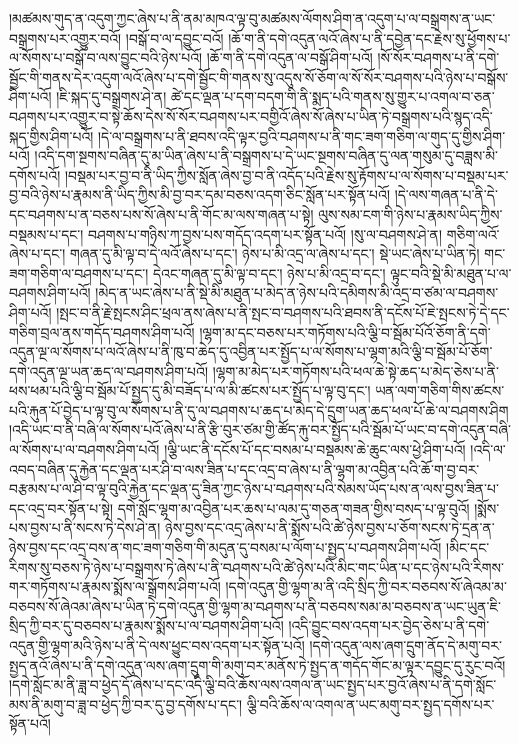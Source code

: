 །མཚམས་གུད་ན་འདུག་ཀྱང་ཞེས་པ་ནི་ནམ་མཁའ་ལྟ་བུ་མཚམས་ལོགས་ཤིག་ན་འདུག་པ་ལ་བསྒྲགས་ན་ཡང་བསྒྲགས་པར་འགྱུར་བའོ། །བསྒོ་བ་ལ་དབྱུང་བའོ། །ཆོ་ག་ནི་དགེ་འདུན་ལའོ་ཞེས་པ་ནི་དབྱེན་དང་རྗེས་སུ་ཕྱོགས་པ་ལ་སོགས་པ་བསྒོ་བ་ལས་བྱུང་བའི་ཉེས་པའོ། །ཆོ་ག་ནི་དགེ་འདུན་ལ་བསྒོ་ཤིག་པའོ། །སོ་སོར་བཤགས་པ་ནི་དགེ་སྦྱོང་གི་གནས་དེར་འདུག་ལའོ་ཞེས་པ་དགེ་སྦྱོང་གི་གནས་སུ་འདུས་སོ་ཅོག་ལ་སོ་སོར་བཤགས་པའི་ཉེས་པ་བསྒོས་ཤིག་པའོ། །ཇི་སྐད་དུ་བསྒྲགས་ཤེ་ན། ཚེ་དང་ལྡན་པ་དག་བདག་གི་ནི་སྨད་པའི་གནས་སུ་གྱུར་པ་འགལ་བ་ཅན་བཤགས་པར་འགྱུར་བ་སྟེ་ཆོས་དེས་སོ་སོར་བཤགས་པར་བགྱིའོ་ཞེས་སོ་ཞེས་པ་ཡིན་ཏེ་བསྒྲགས་པའི་སྙད་འདི་སྐད་གྱིས་ཤིག་པའོ། །དེ་ལ་བསྒྲགས་པ་ནི་ཐབས་འདི་ལྟར་བྱའི་བཤགས་པ་ནི་གང་ཟག་གཅིག་ལ་གུད་དུ་གྱིས་ཤིག་པའོ། །འདི་དག་སྔགས་བཞིན་དུ་མ་ཡིན་ཞེས་པ་ནི་བསྒྲགས་པ་དེ་ཡང་སྔགས་བཞིན་དུ་ལན་གསུམ་དུ་བཟླས་མི་དགོས་པའོ། །བསྡམ་པར་བྱ་བ་ནི་ཡིད་ཀྱིས་སློན་ཞེས་བྱ་བ་ནི་འདོད་པའི་རྗེས་སུ་རྟོགས་པ་ལ་སོགས་པ་བསྡམ་པར་བྱ་བའི་ཉེས་པ་རྣམས་ནི་ཡིད་ཀྱིས་མི་བྱ་བར་དམ་བཅས་འདག་ཅིང་སློན་པར་སྟོན་པའོ། །དེ་ལས་གཞན་པ་ནི་དེ་དང་བཤགས་པ་ན་བཅས་པས་སོ་ཞེས་པ་ནི་གོང་མ་ལས་གཞན་པ་སྟེ། ལུས་སམ་ངག་གི་ཉེས་པ་རྣམས་ཡིད་ཀྱིས་བསྡམས་པ་དང་། བཤགས་པ་གཉིས་ཀ་བྱས་པས་གདོད་འདག་པར་སྟོན་པའོ། །སུ་ལ་བཤགས་ཤེ་ན། གཅིག་ལའོ་ཞེས་པ་དང་། གཞན་དུ་མི་ལྟ་བ་དེ་ལའོ་ཞེས་པ་དང་། ཉེས་པ་མི་འདྲ་ལ་ཞེས་པ་དང་། སྡེ་ཡང་ཞེས་པ་ཡིན་ཏེ། གང་ཟག་གཅིག་ལ་བཤགས་པ་དང་། དེའང་གཞན་དུ་མི་ལྟ་བ་དང་། ཉེས་པ་མི་འདྲ་བ་དང་། ལྟུང་བའི་སྡེ་མི་མཐུན་པ་ལ་བཤགས་ཤིག་པའོ། །མེད་ན་ཡང་ཞེས་པ་ནི་སྡེ་མི་མཐུན་པ་མེད་ན་ཉེས་པའི་དམིགས་མི་འདྲ་བ་ཙམ་ལ་བཤགས་ཤིག་པའོ། །སྤང་བ་ནི་རྗེ་སྤངས་ཤིང་ཕྲལ་ནས་ཞེས་པ་ནི་སྤང་བ་བཤགས་པའི་ཐབས་ནི་དངོས་པོ་ཇེ་སྤངས་ཏེ་དེ་དང་གཅིག་བྲལ་ནས་གདོད་བཤགས་ཤིག་པའོ། །ལྷག་མ་དང་བཅས་པར་གཏོགས་པའི་ལྕི་བ་སྦོམ་པོའོ་ཅོག་ནི་དགེ་འདུན་ལྔ་ལ་སོགས་པ་ལའོ་ཞེས་པ་ནི་ཁུ་བ་ཆེད་དུ་འབྱིན་པར་སྤྱོད་པ་ལ་སོགས་པ་ལྷག་མའི་ལྕི་བ་སྦོམ་པོ་ཅོག་དགེ་འདུན་ལྔ་ཡན་ཆད་ལ་བཤགས་ཤིག་པའོ། །ལྷག་མ་མེད་པར་གཏོགས་པའི་ཕལ་ཆེ་སྟེ་ཆད་པ་མེད་ཅེས་པ་ནི་ཕས་ཕམ་པའི་ལྕི་བ་སྦོམ་པོ་སྤྱད་དུ་མི་བཟོད་པ་ལ་མི་ཚངས་པར་སྤྱོད་པ་ལྟ་བུ་དང་། ཡན་ལག་གཅིག་གིས་ཚངས་པའི་རྐུན་པོ་བྱེད་པ་ལྟ་བུ་ལ་སོགས་པ་ནི་དུ་ལ་བཤགས་པ་ཆད་པ་མེད་དེ་དྲུག་ཡན་ཆད་ཕལ་པོ་ཆེ་ལ་བཤགས་ཤིག །འདི་ཡང་བ་ནི་བཞི་ལ་སོགས་པའོ་ཞེས་པ་ནི་རྩི་བུར་ཙམ་གྱི་ཚོད་རྐུ་བར་སྤྱོད་པའི་སྦོམ་པོ་ཡང་བ་དགེ་འདུན་བཞི་ལ་སོགས་པ་ལ་བཤགས་ཤིག་པའོ། །ལྕི་ཡང་ནི་དངོས་པོ་དང་བསམ་པ་བསྡམས་ཆེ་ཆུང་ལས་ཕྱེ་ཤིག་པའོ། །འདི་ལ་འབད་བཞིན་དུ་རྐྱེན་དང་ལྡན་པར་ཤི་བ་ལས་ཟིན་པ་དང་འདྲ་བ་ཞེས་པ་ནི་ལྷག་མ་འབྱིན་པའི་ཆོ་ག་བྱ་བར་བརྩམས་པ་ལ་ཤི་བ་ལྟ་བུའི་རྐྱེན་དང་ལྡན་དུ་ཟིན་ཀྱང་ཉེས་པ་བཤགས་པའི་སེམས་ཡོད་པས་ན་ལས་བྱས་ཟིན་པ་དང་འདྲ་བར་སྟོན་པ་སྟེ། དགེ་སློང་ལྷག་མ་འབྱིན་པར་ཆས་པ་ལམ་དུ་གཅན་གཟན་གྱིས་བསད་པ་ལྟ་བུའོ། །སྨོས་པས་བྱས་པ་ནི་སངས་ཏེ་དེས་ཤེ་ན། ཉེས་བྱས་དང་འདྲ་ཞེས་པ་ནི་སྨོས་པའི་ཚེ་ཉེས་བྱས་པ་ཅོག་སངས་ཏེ་དྲན་ན་ཉེས་བྱས་དང་འདྲ་བས་ན་གང་ཟག་གཅིག་གི་མདུན་དུ་བསམ་པ་ལོག་པ་སྤྱད་པ་བཤགས་ཤིག་པའོ། །མིང་དང་རིགས་སུ་བཅས་ཏེ་ཉེས་པ་བསྒྲགས་ཏེ་ཞེས་པ་ནི་བཤགས་པའི་ཚེ་ཉེས་པའི་མིང་གང་ཡིན་པ་དང་ཉེས་པའི་རིགས་གར་གཏོགས་པ་རྣམས་སྨོས་ལ་སྒྲོགས་ཤིག་པའོ། །དགེ་འདུན་གྱི་ལྷག་མ་ནི་འདི་སྲིད་ཀྱི་བར་བཅབས་སོ་ཞེའམ་མ་བཅབས་སོ་ཞེའམ་ཞེས་པ་ཡིན་ཏེ་དགེ་འདུན་གྱི་ལྷག་མ་བཤགས་པ་ནི་བཅབས་སམ་མ་བཅབས་ན་ཡང་ཡུན་ཇི་སྲིད་ཀྱི་བར་དུ་བཅབས་པ་རྣམས་སྨོས་པ་ལ་བཤགས་ཤིག་པའོ། །འདི་བྱུང་བས་འདག་པར་བྱེད་ཅེས་པ་ནི་དགེ་འདུན་གྱི་ལྷག་མའི་ཉེས་པ་ནི་དེ་ལས་ཕྱུང་བས་འདག་པར་སྟོན་པའོ། །དགེ་འདུན་ལས་ཞག་དྲུག་ནོད་དེ་མགུ་བར་སྤྱད་ནའོ་ཞེས་པ་ནི་དགེ་འདུན་ལས་ཞག་དྲུག་གི་མགུ་བར་མནོས་ཏེ་སྤྱད་ན་གདོད་གོང་མ་ལྟར་དབྱུང་དུ་རུང་བའོ། །དགེ་སློང་མ་ནི་ཟླ་བ་ཕྱེད་དོ་ཞེས་པ་དང་འདི་ལྕི་བའི་ཆོས་ལས་འགལ་ན་ཡང་སྤྱད་པར་བྱའོ་ཞེས་པ་ནི་དགེ་སློང་མས་ནི་མགུ་བ་ཟླ་བ་ཕྱེད་ཀྱི་བར་དུ་བྱ་དགོས་པ་དང་། ལྕི་བའི་ཆོས་ལ་འགལ་ན་ཡང་མགུ་བར་སྤྱད་དགོས་པར་སྟོན་པའོ། 